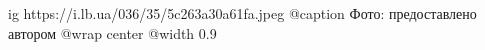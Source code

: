  
 
 
 
 

\ifcmt
  ig https://i.lb.ua/036/35/5c263a30a61fa.jpeg
  @caption Фото: предоставлено автором
  @wrap center
  @width 0.9
\fi
